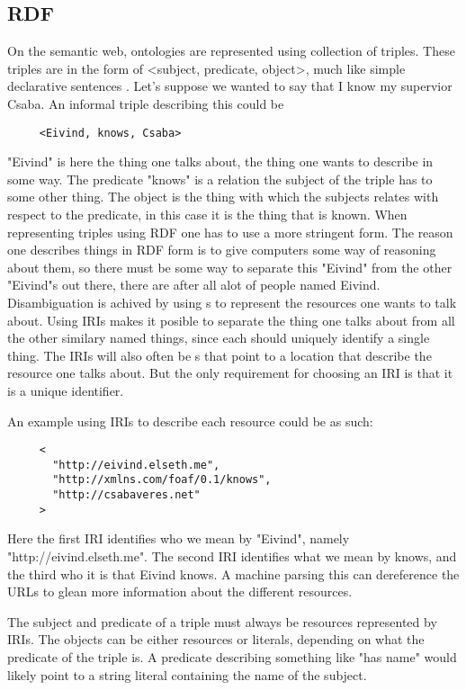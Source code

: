 \subsection{RDF}
On the semantic web, ontologies are represented using collection of  triples.
These triples are in the form of <subject, predicate, object>, much like simple declarative sentences \citep{Berners-Lee2001}.
Let's suppose we wanted to say that I know my supervior Csaba.
An informal triple describing this could be
\begin{verbatim}
     <Eivind, knows, Csaba>
\end{verbatim}
"Eivind" is here the thing one talks about, the thing one wants to describe in some way.
The predicate "knows" is a relation the subject of the triple has to some other thing.
The object is the thing with which the subjects relates with respect to the predicate, in this case it is the thing that is known.
When representing triples using RDF one has to use a more stringent form.
The reason one describes things in RDF form is to give computers some way of reasoning about them,
so there must be some way to separate this "Eivind" from the other "Eivind"s out there,
there are after all alot of people named Eivind.
Disambiguation is achived by using s to represent the resources one wants to talk about.
Using IRIs makes it posible to separate the thing one talks about from all the other similary named things,
since each should uniquely identify a single thing.
The IRIs will also often be s
that point to a location that describe the resource one talks about.
But the only requirement for choosing an IRI is that it is a unique identifier.

An example using IRIs to describe each resource could be as such:
\begin{verbatim}
     <
       "http://eivind.elseth.me",
       "http://xmlns.com/foaf/0.1/knows",
       "http://csabaveres.net"
     >
\end{verbatim}
Here the first IRI identifies who we mean by "Eivind", namely "http://eivind.elseth.me".
The second IRI identifies what we mean by knows, and the third who it is that Eivind knows.
A machine parsing this can dereference the URLs to glean more information about the different resources.

The subject and predicate of a triple must always be resources represented by IRIs.
The objects can be either resources or literals, depending on what the predicate of the triple is.
A predicate describing something like "has name" would likely point to a string literal containing the name of the subject\citep{Hebeler2009Chp3}.

